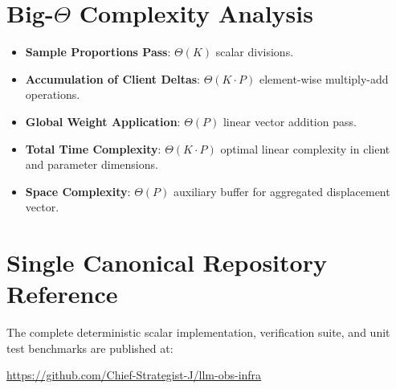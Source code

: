 \documentclass[11pt,a4paper]{article}
\theoremstyle{definition}
\begin{document}
\section{Big-$\Theta$ Complexity Analysis}

\begin{itemize}
    \item \textbf{Sample Proportions Pass}: $\Theta(K)$ scalar divisions.
    \item \textbf{Accumulation of Client Deltas}: $\Theta(K \cdot P)$ element-wise multiply-add operations.
    \item \textbf{Global Weight Application}: $\Theta(P)$ linear vector addition pass.
    \item \textbf{Total Time Complexity}: $\Theta(K \cdot P)$ optimal linear complexity in client and parameter dimensions.
    \item \textbf{Space Complexity}: $\Theta(P)$ auxiliary buffer for aggregated displacement vector.
\end{itemize}

\section{Single Canonical Repository Reference}

The complete deterministic scalar implementation, verification suite, and unit test benchmarks are published at:
\begin{center}
\url{https://github.com/Chief-Strategist-J/llm-obs-infra}
\end{center}
\end{document}
